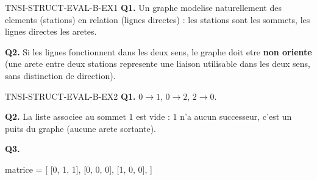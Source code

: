 \begin{corrige}{TNSI-STRUCT-EVAL-B-EX1}
\textbf{Q1.} Un graphe modelise naturellement des elements (stations) en relation (lignes directes) : les stations sont les sommets, les lignes directes les aretes.

\textbf{Q2.} Si les lignes fonctionnent dans les deux sens, le graphe doit etre \textbf{non oriente} (une arete entre deux stations represente une liaison utilisable dans les deux sens, sans distinction de direction).
\end{corrige}

\begin{corrige}{TNSI-STRUCT-EVAL-B-EX2}
\textbf{Q1.} $0\to1$, $0\to2$, $2\to0$.

\textbf{Q2.} La liste associee au sommet $1$ est vide : $1$ n'a aucun successeur, c'est un puits du graphe (aucune arete sortante).

\textbf{Q3.}
\begin{python}
matrice = [
    [0, 1, 1],
    [0, 0, 0],
    [1, 0, 0],
]
\end{python}
\end{corrige}
